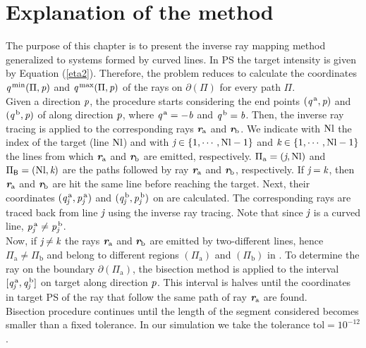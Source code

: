 \section{Explanation of the method}
The purpose of this chapter is to present the inverse ray mapping method generalized to systems formed by curved lines. In PS the target intensity is given by Equation (\ref{eta2}). Therefore, the problem reduces to calculate the coordinates 
$\textit{q}^{\textrm{\,min}}(\Pi, \textit{p})$ and $\textit{q}^{\textrm{\,max}}(\Pi, \textit{p})$ of the rays on $\partial$$(\Pi)$ for every path $\Pi$.\\ \indent 
Given a direction $\textit{p}$, the procedure starts considering the end points $(\textit{q}^{\,\textrm{a}}, \textit{p})$ and $(\textit{q}^{\,\textrm{b}}, \textit{p})$ of  along direction $\textit{p}$, where $\textit{q}^{\,\textrm{a}} = -\textit{b}$ and $\textit{q}^{\,\textrm{b}} = \textit{b}$. Then, the 
inverse ray tracing is applied to the corresponding rays $\textit{\textbf{r}}_{\textrm{a}}$ and $\textit{\textbf{r}}_{\textrm{b}}$. We indicate with $\textrm{Nl}$ the index of the target (line $\textrm{Nl}$) and with $\textit{j}\in\{1,\cdots, \textrm{Nl}-1\}$ and $\textit{k}\in\{1,\cdots, \textrm{Nl}-1\}$ the lines from which $\textit{\textbf{r}}_{\textrm{a}}$ and $\textit{\textbf{r}}_{\textrm{b}}$ are emitted, respectively. $\Pi_\textrm{a} = (\textit{j}, \textrm{Nl})$ and $\Pi_{\textsf{B}} = (\textrm{Nl}, \textit{k})$ are the paths followed by ray $\textit{\textbf{r}}_{\textrm{a}}$ and $\textit{\textbf{r}}_{\textrm{b}}$, respectively. If $\textit{j}= \textit{k}$, then $\textit{\textbf{r}}_{\textrm{a}}$ and $\textit{\textbf{r}}_{\textrm{b}}$ are hit the same line before reaching the target. 
Next, their coordinates $(\textit{q}_{\textit{j}}^{\,\textrm{a}}, \textit{p}_{\textit{j}}^{\,\textrm{a}})$ and $(\textit{q}_{\textit{j}}^{\,\textrm{b}}, \textit{p}_{\textit{j}}^{\,\textrm{b}})$ on  are calculated. The corresponding rays are traced back from line $\textit{j}$ using the inverse ray tracing. Note that since $\textit{j}$ is a curved line, $ \textit{p}_{\textit{j}}^{\,\textrm{a}}\neq \textit{p}_{\textit{j}}^{\,\textrm{b}}$.
\\ \indent Now, if $\textit{j}\neq \textit{k}$ the rays $\textit{\textbf{r}}_\textrm{a}$ and $\textit{\textbf{r}}_\textrm{b}$ are emitted by two-different lines, hence $\Pi_{\textrm{a}}\neq \Pi_{\textrm{b}}$ and belong to different regions $(\Pi_{\textrm{a}})$ and $(\Pi_{\textrm{b}})$ in . To determine the ray on the boundary $\partial$$(\Pi_{\textrm{a}})$, the bisection method is applied to the interval $[\textit{q}_{\textit{j}}^{\,\textrm{a}}, \textit{q}_{\textit{j}}^{\,\textrm{b}}]$ on target \set{}{}{} along direction $\textit{p}$. This interval is halves until the coordinates in target PS of the ray that follow the same path of ray $\textit{\textbf{r}}_{\textrm{a}}$ are found. \\ \indent Bisection procedure continues until the length of the segment considered becomes smaller than a fixed tolerance. In our simulation we take the tolerance $\textrm{tol}= 10^{-12}$. 
